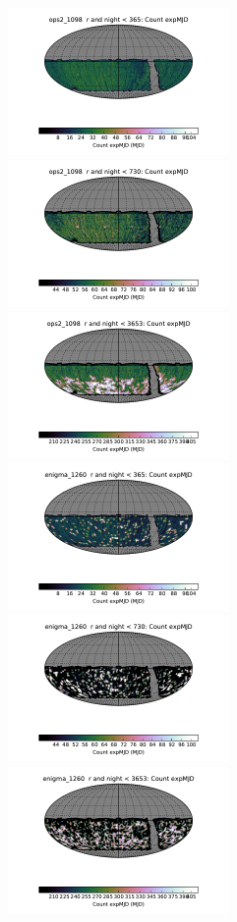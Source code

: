 \begin{figure}
  \includegraphics[width=2.3in]{figs/ops2_1098_Count_expMJD_r_and_night_lt_365_HEAL_SkyMap.pdf}\includegraphics[width=2.3in]{figs/ops2_1098_Count_expMJD_r_and_night_lt_730_HEAL_SkyMap.pdf}\includegraphics[width=2.3in]{figs/ops2_1098_Count_expMJD_r_and_night_lt_3653_HEAL_SkyMap.pdf} \\
  \includegraphics[width=2.3in]{figs/enigma_1260_Count_expMJD_r_and_night_lt_365_HEAL_SkyMap.pdf}\includegraphics[width=2.3in]{figs/enigma_1260_Count_expMJD_r_and_night_lt_730_HEAL_SkyMap.pdf}\includegraphics[width=2.3in]{figs/enigma_1260_Count_expMJD_r_and_night_lt_3653_HEAL_SkyMap.pdf}

\end{figure}
